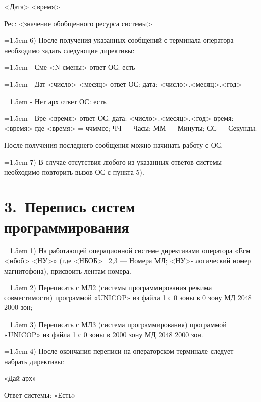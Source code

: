 \documentclass[11pt,a4paper]{article}
\begin{document}
<Дата> <время>

Рес: <значение обобщенного ресурса системы>

\par\hangindent=1.5em 6) После получения указанных сообщений с терминала оператора необходимо задать следующие директивы:\par
\par\hangindent=1.5em - Сме <N смены> ответ ОС: есть\par
\par\hangindent=1.5em - Дат <число> <месяц> ответ ОС: дата: <число>.<месяц>.<год>\par
\par\hangindent=1.5em - Нет арх ответ ОС: есть\par
\par\hangindent=1.5em - Вре <время> ответ ОС: дата: <число>.<месяц>.<год> время: <время> где <время> = ччммсс; ЧЧ --- Часы; ММ --- Минуты; СС --- Секунды.\par
После получения последнего сообщения можно начинать работу с ОС.

\par\hangindent=1.5em 7) В случае отсутствия любого из указанных ответов системы необходимо повторить вызов ОС с пункта 5).\par
\section*{3.~Перепись систем программирования}
\par\hangindent=1.5em 1) На работающей операционной системе директивами оператора «Есм <нбоб> <НУ>» (где <НБОБ>=2,3 --- Номера МЛ; <НУ>- логический номер магнитофона), присвоить лентам номера.\par
\par\hangindent=1.5em 2) Переписать с МЛ2 (системы программирования режима совместимости) программой «UNICOP» из файла 1 с 0 зоны в 0 зону МД 2048 2000 зон;\par
\par\hangindent=1.5em 3) Переписать с МЛ3 (система программирования) программой «UNICOP» из файла 1 с 0 зоны в 2000 зону МД 2048 2000 зон.\par
\par\hangindent=1.5em 4) После окончания переписи на операторском терминале следует набрать директивы:\par
«Дай арх»

Ответ системы: «Есть»
\end{document}
